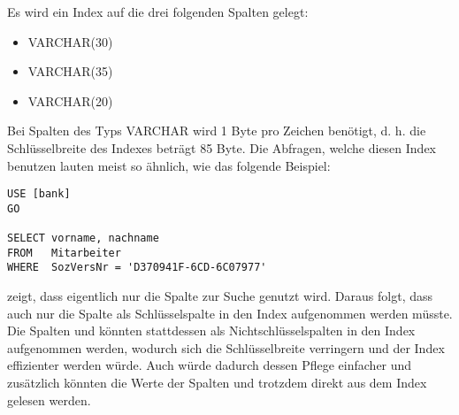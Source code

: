         Es wird ein Index auf die drei folgenden Spalten gelegt:
        \begin{itemize}
            \item {} VARCHAR(30)
            \item {} VARCHAR(35)
            \item {} VARCHAR(20)
        \end{itemize}
        Bei Spalten des Typs VARCHAR wird 1 Byte pro Zeichen benötigt, d. h. die
        Schlüsselbreite des Indexes beträgt 85 Byte. Die Abfragen, welche diesen
        Index benutzen lauten meist so ähnlich, wie das folgende Beispiel:
        \begin{lstlisting}[language=ms_sql, caption={Beispielabfrage},
        label=admin05_10] 
USE [bank]
GO

SELECT vorname, nachname
FROM   Mitarbeiter
WHERE  SozVersNr = 'D370941F-6CD-6C07977'
        \end{lstlisting}
         zeigt, dass eigentlich nur die Spalte
         zur Suche genutzt wird. Daraus folgt, dass auch
        nur die Spalte  als Schlüsselspalte in den Index
        aufgenommen werden müsste. Die Spalten  und
         könnten stattdessen als Nichtschlüsselspalten in
        den Index aufgenommen werden, wodurch sich die Schlüsselbreite
        verringern und der Index effizienter werden würde. Auch würde dadurch
        dessen Pflege einfacher und zusätzlich könnten die Werte der Spalten
         und  trotzdem direkt aus dem
        Index gelesen werden.
        
